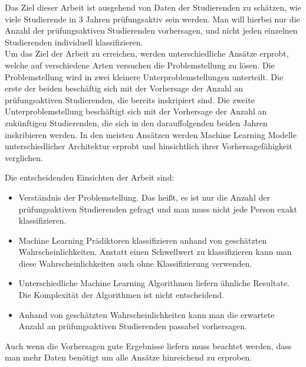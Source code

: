 

Das Ziel dieser Arbeit ist ausgehend von Daten der Studierenden zu sch\"atzen, wie viele
Studierende in 3 Jahren pr\"ufungsaktiv sein werden. Man will hierbei nur die Anzahl der pr\"ufungsaktiven Studierenden vorhersagen,
und nicht jeden einzelnen Studierenden individuell klassifizieren. \\

Um das Ziel der Arbeit zu erreichen, werden unterschiedliche Ans\"atze erprobt, welche auf verschiedene Arten versuchen die Problemstellung zu l\"osen.
Die Problemstellung wird in zwei kleinere Unterproblemstellungen unterteilt. Die erste der beiden besch\"aftig sich mit der Vorhersage der Anzahl an pr\"ufungsaktiven Studierenden,
die bereits inskripiert sind. Die zweite Unterproblemstellung besch\"aftigt sich mit der Vorhersage der Anzahl an zuk\"unftigen Studierenden, die sich in den darauffolgenden beiden Jahren inskribieren werden.
In den meisten Ans\"atzen werden Machine Learning Modelle unterschiedlicher Architektur erprobt und hinsichtlich ihrer Vorhersagef\"ahigkeit
verglichen.

Die entscheidenden Einsichten der Arbeit sind:
\begin{itemize}
    \item Verst\"andnis der Problemstellung. Das hei{\ss}t, es ist nur die Anzahl der pr\"ufungsaktiven Studierenden gefragt und man muss nicht jede Person exakt klassifizieren.
    \item Machine Learning Pr\"adiktoren klassifizieren anhand von gesch\"atzten Wahrscheinlichkeiten. Anstatt einen Schwellwert zu klassifizieren
          kann man diese Wahrscheinlichkeiten auch ohne Klassifizierung verwenden.
    \item Unterschiedliche Machine Learning Algorithmen liefern \"ahnliche Resultate. Die Komplexit\"at der Algorithmen ist nicht entscheidend.
    \item Anhand von gesch\"atzten Wahrscheinlichkeiten kann man die erwartete Anzahl an pr\"ufungsaktiven Studierenden passabel vorhersagen.
\end{itemize}

Auch wenn die Vorhersagen gute Ergebnisse liefern muss beachtet werden, dass man mehr Daten ben\"otigt um alle Ans\"atze hinreichend zu erproben.
